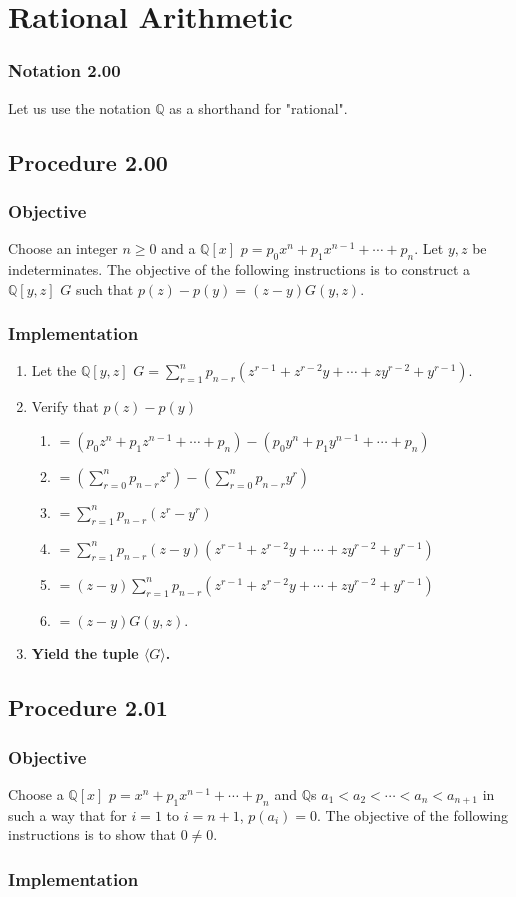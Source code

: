 \documentclass[twocolumn]{article}
\newcommand{\notation}[1]{\subsubsection*{Notation #1}}
\newcommand{\procedure}[2][]{\subsection*{Procedure #2 \ifthenelse{\equal{#1}{}}{}{(#1)}}\label{sec:procedure #2}}
\newcommand{\objective}{\subsubsection*{Objective}}
\newcommand{\implementation}{\subsubsection*{Implementation}}
\begin{document}
	\section{Rational Arithmetic}
		\notation{2.00}
			Let us use the notation $\mathbb{Q}$ as a shorthand for "rational".
		\procedure{2.00}
			\objective
				Choose an integer $n\ge 0$ and a $\mathbb{Q}[x]$ $p=p_0x^n+p_1x^{n-1}+\cdots+p_n$. Let $y,z$ be indeterminates. The objective of the following instructions is to construct a $\mathbb{Q}[y,z]$ $G$ such that $p(z)-p(y)=(z-y)G(y,z)$.
			\implementation
				\begin{enumerate}
					\item Let the $\mathbb{Q}[y,z]$ $G=\sum_{r=1}^n p_{n-r}(z^{r-1}+z^{r-2}y+\cdots+zy^{r-2}+y^{r-1})$.
					\item Verify that $p(z)-p(y)$
					\begin{enumerate}
						\item $=(p_0z^n+p_1z^{n-1}+\cdots+p_n)-(p_0y^n+p_1y^{n-1}+\cdots+p_n)$
						\item $=(\sum_{r=0}^n p_{n-r}z^r)-(\sum_{r=0}^n p_{n-r}y^r)$
						\item $=\sum_{r=1}^n p_{n-r}(z^r-y^r)$
						\item $=\sum_{r=1}^n p_{n-r}(z-y)(z^{r-1}+z^{r-2}y+\cdots+zy^{r-2}+y^{r-1})$
						\item $=(z-y)\sum_{r=1}^n p_{n-r}(z^{r-1}+z^{r-2}y+\cdots+zy^{r-2}+y^{r-1})$
						\item $=(z-y)G(y,z)$.
					\end{enumerate}
					\item \textbf{Yield the tuple $\langle G\rangle$.}
				\end{enumerate}
		\procedure{2.01}
			\objective
				Choose a $\mathbb{Q}[x]$ $p=x^n+p_1x^{n-1}+\cdots+p_n$ and $\mathbb{Q}$s $a_1<a_2<\cdots<a_n<a_{n+1}$ in such a way that for $i=1$ to $i=n+1$, $p(a_i)=0$. The objective of the following instructions is to show that $0\ne 0$.
			\implementation
\end{document}
